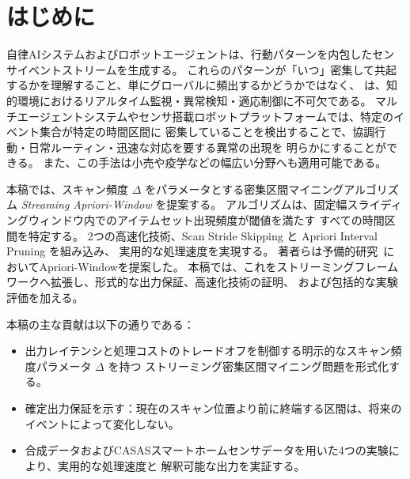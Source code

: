 \section{はじめに}

自律AIシステムおよびロボットエージェントは、行動パターンを内包したセンサイベントストリームを生成する。
これらのパターンが「いつ」密集して共起するかを理解すること、単にグローバルに頻出するかどうかではなく、
は、知的環境におけるリアルタイム監視・異常検知・適応制御に不可欠である。
マルチエージェントシステムやセンサ搭載ロボットプラットフォームでは、特定のイベント集合が特定の時間区間に
密集していることを検出することで、協調行動・日常ルーティン・迅速な対応を要する異常の出現を
明らかにすることができる。
また、この手法は小売や疫学などの幅広い分野へも適用可能である。

本稿では、スキャン頻度 $\Delta$ をパラメータとする密集区間マイニングアルゴリズム
\textit{Streaming Apriori-Window} を提案する。
アルゴリズムは、固定幅スライディングウィンドウ内でのアイテムセット出現頻度が閾値を満たす
すべての時間区間を特定する。
2つの高速化技術、Scan Stride Skipping と Apriori Interval Pruning を組み込み、
実用的な処理速度を実現する。
著者らは予備的研究~\cite{takayasu2025arxiv}においてApriori-Windowを提案した。
本稿では、これをストリーミングフレームワークへ拡張し、形式的な出力保証、高速化技術の証明、
および包括的な実験評価を加える。

本稿の主な貢献は以下の通りである：
\begin{itemize}
  \item 出力レイテンシと処理コストのトレードオフを制御する明示的なスキャン頻度パラメータ $\Delta$ を持つ
        ストリーミング密集区間マイニング問題を形式化する。
  \item 確定出力保証を示す：現在のスキャン位置より前に終端する区間は、将来のイベントによって変化しない。
  \item 合成データおよびCASASスマートホームセンサデータを用いた4つの実験により、実用的な処理速度と
        解釈可能な出力を実証する。
\end{itemize}

